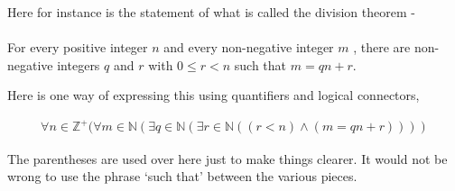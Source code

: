 \documentclass[12pt]{article}
\begin{document}
Here for instance is the statement of what is called the division theorem - 

\paragraph{}
For every positive integer $n$  and every non-negative integer $m$ , there are non-negative integers $q$ and $r$ with $0 \le r < n$ such that $m = qn + r$.

Here is one way of expressing this using quantifiers and logical connectors,

\begin{align*}
\forall n \in \mathbb{Z^+} (\forall m \in \mathbb{N} (\exists q \in \mathbb{N} (\exists r \in \mathbb{N} ((r < n) \wedge (m = qn +r))))
\end{align*}

The parentheses are used over here just to make things clearer. It would not be wrong to use the phrase `such that' between the various pieces. 
\end{document}
